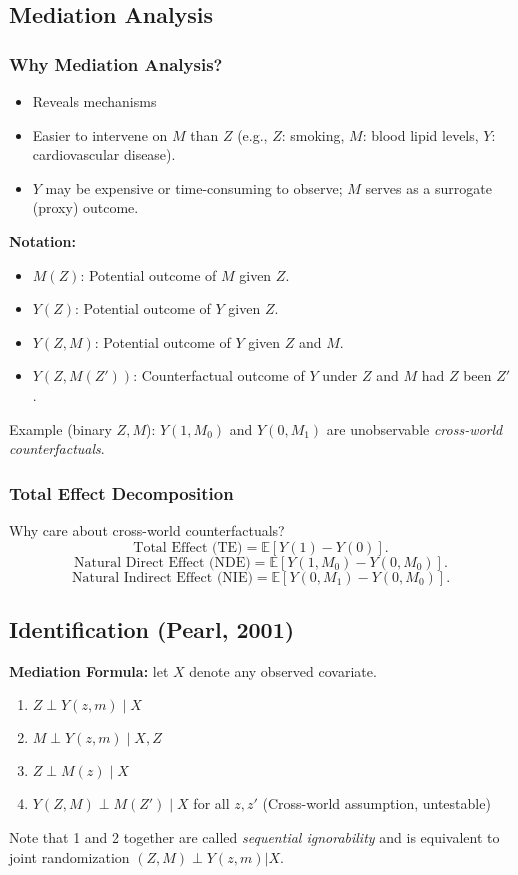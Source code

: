 \subsection*{Mediation Analysis}

\subsubsection*{Why Mediation Analysis?}
\begin{itemize}
    \item Reveals mechanisms
    \item Easier to intervene on $M$ than $Z$ (e.g., $Z$: smoking, $M$: blood lipid levels, $Y$: cardiovascular disease).
    \item $Y$ may be expensive or time-consuming to observe; $M$ serves as a surrogate (proxy) outcome.
\end{itemize}

\textbf{Notation:}
\begin{itemize}
    \item $M(Z)$: Potential outcome of $M$ given $Z$.
    \item $Y(Z)$: Potential outcome of $Y$ given $Z$.
    \item $Y(Z, M)$: Potential outcome of $Y$ given $Z$ and $M$.
    \item $Y(Z, M(Z'))$: Counterfactual outcome of $Y$ under $Z$ and $M$ had $Z$ been $Z'$.
\end{itemize}

Example (binary $Z, M$):  
$Y(1, M_0)$ and $Y(0, M_1)$ are unobservable \textit{cross-world counterfactuals}.

\subsubsection*{Total Effect Decomposition}
Why care about cross-world counterfactuals?
\[
\text{Total Effect (TE)} = \mathbb{E}[Y(1) - Y(0)].
\]
\[
\text{Natural Direct Effect (NDE)} = \mathbb{E}[Y(1, M_0) - Y(0, M_0)].
\]
\[
\text{Natural Indirect Effect (NIE)} = \mathbb{E}[Y(0, M_1) - Y(0, M_0)].
\]

\subsection*{Identification (Pearl, 2001)}

\textbf{Mediation Formula:} let $X$ denote any observed covariate.
\begin{enumerate}
    \item $Z \perp Y(z, m) \mid X$ 
    \item $M \perp Y(z, m) \mid X, Z$
    \item $Z \perp M(z) \mid X$
    \item $Y(Z, M) \perp M(Z') \mid X$ for all $z, z'$ (Cross-world assumption, untestable)
\end{enumerate}
Note that 1 and 2 together are called \textit{sequential ignorability} and is equivalent to joint randomization $(Z,M)\perp Y(z,m) | X$.


